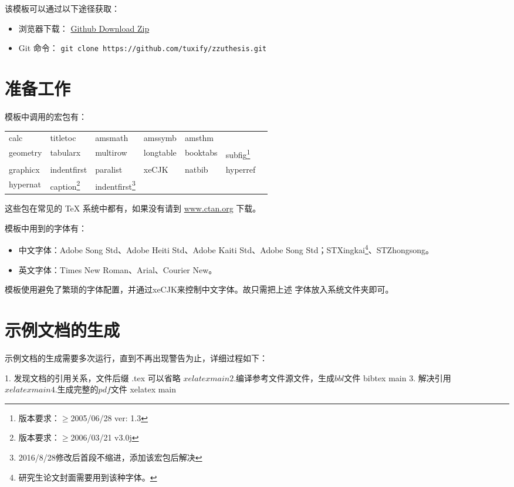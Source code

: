 该模板可以通过以下途径获取：
\begin{itemize}
\item 浏览器下载：
\href{https://codeload.github.com/tuxify/zzuthesis/zip/master}{Github Download Zip}
\item Git 命令：
\texttt{git clone https://github.com/tuxify/zzuthesis.git}
\end{itemize}

\section{准备工作}

模板中调用的宏包有：
\begin{center}
\begin{minipage}{1.0\linewidth}\centering
\begin{tabular}{*{7}{l}}\hline
calc & titletoc & amsmath & amssymb & amsthm & \\%
geometry & tabularx & multirow & longtable & booktabs & subfig\footnote{版本要求：$\geq$2005/06/28 ver: 1.3} \\
graphicx & indentfirst & paralist & xeCJK & natbib & hyperref \\
hypernat & caption\footnote{版本要求：$\geq$2006/03/21 v3.0j} & indentfirst\footnote{2016/8/28修改后首段不缩进，添加该宏包后解决}& & &\\\hline
\end{tabular}
\end{minipage}
\end{center}

这些包在常见的 \TeX{} 系统中都有，如果没有请到 \url{www.ctan.org} 下载。

模板中用到的字体有：
\begin{itemize}
\item 中文字体：Adobe Song Std、Adobe Heiti Std、Adobe Kaiti Std、Adobe Song
Std；STXingkai\footnote{研究生论文封面需要用到该种字体。}、STZhongsong。
\item 英文字体：Times New Roman、Arial、Courier New。
\end{itemize}

模板使用\XeTeX{}避免了繁琐的字体配置，并通过xeCJK来控制中文字体。故只需把上述
字体放入系统文件夹即可。

\section{示例文档的生成}

示例文档的生成需要多次运行\XeLaTeX{}，直到不再出现警告为止，详细过程如下：
\begin{code}
1. 发现文档的引用关系，文件后缀 .tex 可以省略
$ xelatex main
2. 编译参考文件源文件，生成 bbl 文件
$ bibtex main
3. 解决引用
$ xelatex main
4. 生成完整的 pdf 文件
$ xelatex main
\end{code}

